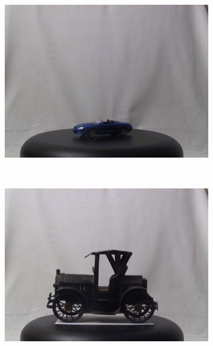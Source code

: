 \documentclass[runningheads]{llncs}
\begin{document}
\begin{figure}[htb]
\begin{subfigure}[t]{0.15\columnwidth}
        \includegraphics[width=1\columnwidth]{images/3d/3}
    \end{subfigure}%
    ~ %
    \begin{subfigure}[t]{0.15\columnwidth}
        \centering
        \includegraphics[width=1\columnwidth]{images/3d/4}
    \end{subfigure}%
    ~ %
    \begin{subfigure}[t]{0.15\columnwidth}
        \centering

\end{subfigure}
\end{figure}
\end{document}
